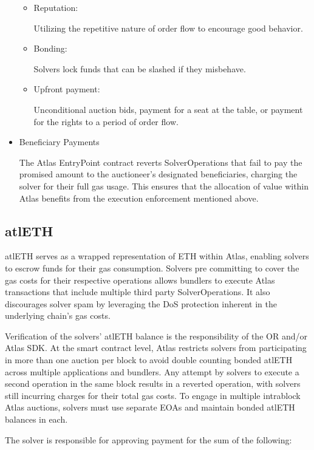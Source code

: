 \documentclass{article}
\begin{document}
\begin{itemize}
\begin{itemize}
\item Reputation: 

Utilizing the repetitive nature of order flow to encourage good behavior.


\item Bonding: 

Solvers lock funds that can be slashed if they misbehave.


\item Upfront payment: 

Unconditional auction bids, payment for a seat at the table, or payment for the rights to a period of order flow.
\end{itemize}

\item Beneficiary Payments

The Atlas EntryPoint contract reverts SolverOperations that fail to pay the promised amount to the auctioneer’s designated beneficiaries, charging the solver for their full gas usage. This ensures that the allocation of value within Atlas benefits from the execution enforcement mentioned above.

\end{itemize}

\subsection{atlETH}
atlETH serves as a wrapped representation of ETH within Atlas, enabling solvers to escrow funds for their gas consumption. Solvers pre committing to cover the gas costs for their respective operations allows bundlers to execute Atlas transactions that include multiple third party SolverOperations. It also discourages solver spam by leveraging the DoS protection inherent in the underlying chain's gas costs.

Verification of the solvers' atlETH balance is the responsibility of the OR and/or Atlas SDK. At the smart contract level, Atlas restricts solvers from participating in more than one auction per block to avoid double counting bonded atlETH across multiple applications and bundlers. Any attempt by solvers to execute a second operation in the same block results in a reverted operation, with solvers still incurring charges for their total gas costs. To engage in multiple intrablock Atlas auctions, solvers must use separate EOAs and maintain bonded atlETH balances in each.

The solver is responsible for approving payment for the sum of the following:
\end{document}
